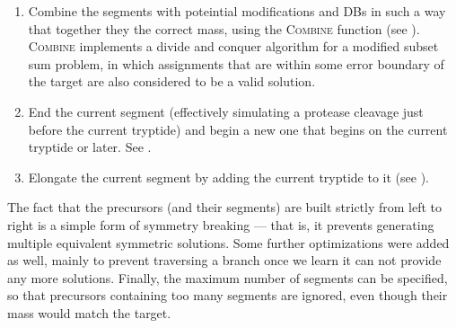 \begin{enumerate}
	\item Combine the  segments with poteintial modifications and DBs in such a way that together they the correct mass, using the \textsc{Combine} function (see ). \textsc{Combine} implements a divide and conquer algorithm for a modified subset sum problem, in which assignments that are within some error boundary of the target are also considered to be a valid solution.
	\item End the current segment (effectively simulating a protease cleavage just before the current tryptide) and begin a new one that begins on the current tryptide or later. See .
	\item Elongate the current segment by adding the current tryptide to it (see ).
\end{enumerate}

The fact that the precursors (and their segments) are built strictly from left to right is a simple form of symmetry breaking --- that is, it prevents generating multiple equivalent symmetric solutions. Some further optimizations were added as well, mainly to prevent traversing a branch once we learn it can not provide any more solutions. Finally, the maximum number of segments can be specified, so that precursors containing too many segments are ignored, even though their mass would match the target.


